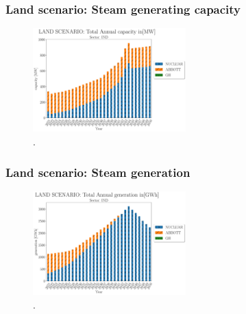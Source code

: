 \begin{frame}
  \frametitle{Land scenario: Steam generating capacity}
  \begin{figure}[htbp!]
    \begin{center}
      \includegraphics[height=4cm]{./images/land scenario_ind_capacity.png}
    \end{center}
    \caption{.} 
    \label{fig:land-stm-cap}
  \end{figure}
\end{frame}

\begin{frame}
  \frametitle{Land scenario: Steam generation}
  \begin{figure}[htbp!]
    \begin{center}
      \includegraphics[height=4cm]{./images/land scenario_ind_generation.png}
    \end{center}
    \caption{.} 
    \label{fig:land-stm-gen}
  \end{figure}
\end{frame}
